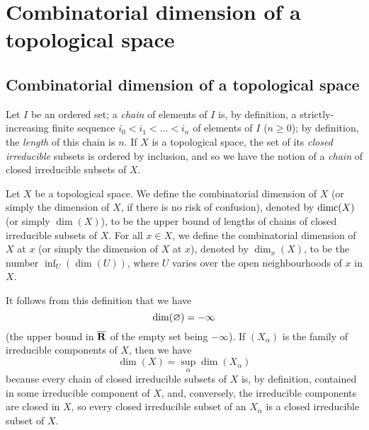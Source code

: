 \section{Combinatorial dimension of a topological space}
\label{section:combinatorial-dimension-of-a-topological-space}


\subsection{Combinatorial dimension of a topological space}
\label{subsection:combinatorial-dimension-of-a-topological-space}

\begin{env}[14.1.1]
\label{0.14.1.1}
Let $I$ be an ordered set;
a \emph{chain} of elements of $I$ is, by definition, a strictly-increasing finite sequence $i_0<i_1<\ldots<i_n$ of elements of $I$ ($n\geq0$);
by definition, the \emph{length} of this chain is $n$.
If $X$ is a topological space, the set of its \emph{closed irreducible} subsets is ordered by inclusion, and so we have the notion of a \emph{chain} of closed irreducible subsets of $X$.
\end{env}

\begin{defn}[14.1.2]
\label{0.14.1.2}
Let $X$ be a topological space.
We define the combinatorial dimension of $X$ (or simply the dimension of $X$, if there is no risk of confusion), denoted by ${\mathop{\mathrm{dimc}}\nolimits}(X)$ (or simply $\dim(X)$), to be the upper bound of lengths of chains of closed irreducible subsets of $X$.
For all $x\in X$, we define the combinatorial dimension of $X$ at $x$ (or simply the dimension of $X$ at $x$), denoted by $\dim_x(X)$, to be the number $\inf_U(\dim(U))$, where $U$ varies over the open neighbourhoods of $x$ in $X$.
\end{defn}

It follows from this definition that we have
\[
    {\mathop{\mathrm{dim}}\nolimits}(\varnothing) = -\infty
\]
(the upper bound in $\overline{\mathbf{R}}$ of the empty set being $-\infty$).
If $(X_\alpha)$ is the family of irreducible components of $X$, then we have
\begin{equation*}
\label{0.14.1.2.1}
    \dim(X) = \sup_\alpha\dim(X_\alpha)\tag{14.1.2.1}
\end{equation*}
because every chain of closed irreducible subsets of $X$ is, by definition, contained in some irreducible component of $X$, and, conversely, the irreducible components are closed in $X$, so every closed irreducible subset of an $X_\alpha$ is a closed irreducible subset of $X$.

